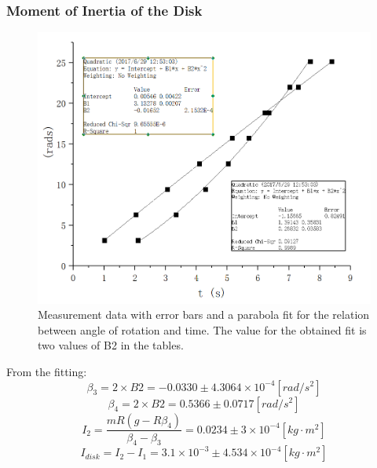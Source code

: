 \documentclass[12pt]{article}
\begin{document}
\subsubsection{Moment of Inertia of the Disk}
\begin{figure}[H]
\centering
\includegraphics[width=1\linewidth]{P2.jpg}
\caption{Measurement data with error bars and a parabola fit for the relation between angle of rotation and time. The value for the obtained fit is two values of B2 in the tables.}
\end{figure}
From the fitting:
$$\beta_3=2\times{B2}=-0.0330\pm4.3064	\times10^{-4}[rad/s^2]$$
$$\beta_4=2\times{B2}=0.5366\pm0.0717[rad/s^2]$$
$$I_2=\frac{mR(g-R\beta_4)}{\beta_4-\beta_3}=0.0234\pm3\times10^{-4}[kg\cdot{m^2}]$$
$$I_{disk}=I_2-I_1=3.1\times10^{-3}\pm4.534\times10^{-4}[kg\cdot{m^2}]$$
\end{document}
